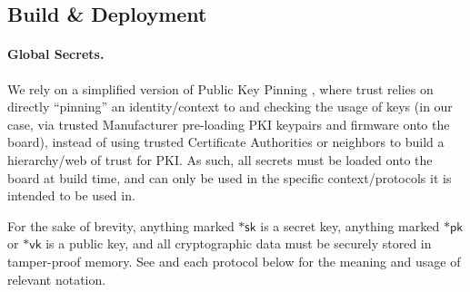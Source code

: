 \subsection{Build \& Deployment}



\paragraph{Global Secrets.} We rely on a simplified version of Public Key Pinning \cite{PKIPinning}, where trust relies on directly ``pinning'' an identity/context to and checking the usage of keys (in our case, via trusted Manufacturer pre-loading PKI keypairs and firmware onto the board), instead of using trusted Certificate Authorities or neighbors to build a hierarchy/web of trust for PKI. As such, all secrets must be loaded onto the board at build time, and can only be used in the specific context/protocols it is intended to be used in.

For the sake of brevity, anything marked $\mathsf{*sk}$ is a secret key, anything marked $\mathsf{*pk}$ or $\mathsf{*vk}$ is a public key, and all cryptographic data must be securely stored in tamper-proof memory. See  and each protocol below for the meaning and usage of relevant notation.

